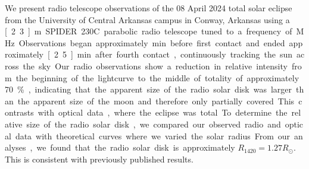 We present radio telescope observations of the 08 April 2024 total solar eclipse from the University of Central Arkansas campus in Conway, Arkansas using a \unit[2.3]{m} SPIDER 230C parabolic radio telescope tuned to a frequency of \unit[1420]{MHz}.
Observations began approximately \unit[19]{min} before first contact and ended approximately \unit[2.5]{min} after fourth contact, continuously tracking the sun across the sky.
Our radio observations show a reduction in relative intensity from the beginning of the lightcurve to the middle of totality of approximately 70\%, indicating that the apparent size of the radio solar disk was larger than the apparent size of the moon and therefore only partially covered.
This contrasts with optical data, where the eclipse was total.
To determine the relative size of the radio solar disk, we compared our observed radio and optical data with theoretical curves where we varied the solar radius.
From our analyses, we found that the radio solar disk is approximately $R_{\mathrm{1420}} = 1.27 R_{\odot}$.
This is consistent with previously published results.